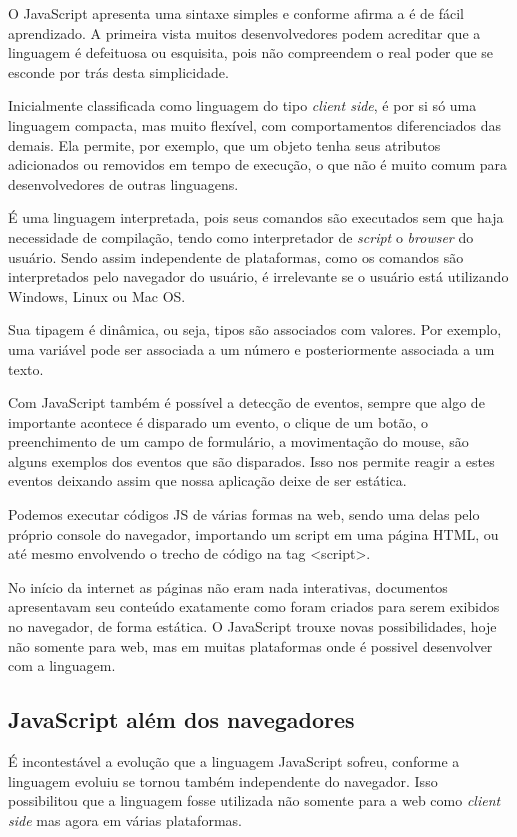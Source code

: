 \documentclass[
	12pt,				%
	openright,			%
	twoside,			%
	a4paper,			%
	english,			%
	brazil				%
	]{abntex2}
\begin{document}
O JavaScript apresenta uma sintaxe simples e conforme afirma a \citeauthor{w3schools_javascript} é de fácil aprendizado. A primeira vista muitos desenvolvedores podem acreditar que a linguagem é defeituosa ou esquisita, pois não compreendem o real poder que se esconde por trás desta simplicidade.

Inicialmente classificada como linguagem do tipo \textit{client side}, é por si só uma linguagem compacta, mas muito flexível, com comportamentos diferenciados das demais. Ela permite, por exemplo, que um objeto tenha seus atributos adicionados ou removidos em tempo de execução, o que não é muito comum para desenvolvedores de outras linguagens.

É uma linguagem interpretada, pois seus comandos são executados sem que haja necessidade de compilação, tendo como interpretador de \textit{script} o \textit{browser} do usuário. Sendo assim independente de plataformas, como os comandos são interpretados pelo navegador do usuário, é irrelevante se o usuário está utilizando Windows, Linux ou Mac OS.

Sua tipagem é dinâmica, ou seja, tipos são associados com valores. Por exemplo, uma variável pode ser associada a um número e posteriormente associada a um texto.

Com JavaScript também é possível a detecção de eventos, sempre que algo de importante acontece é disparado um evento, o clique de um botão, o preenchimento de um campo de formulário, a movimentação do mouse, são alguns exemplos dos eventos que são disparados. Isso nos permite reagir a estes eventos deixando assim que nossa aplicação deixe de ser estática.

Podemos executar códigos JS de várias formas na web, sendo uma delas pelo próprio console do navegador, importando um script em uma página HTML, ou até mesmo envolvendo o trecho de código na tag <script>.

No início da internet as páginas não eram nada interativas, documentos apresentavam seu conteúdo exatamente como foram criados para serem exibidos no navegador, de forma estática. O JavaScript trouxe novas possibilidades, hoje não somente para web, mas em muitas plataformas onde é possivel desenvolver com a linguagem. 

\subsection{JavaScript além dos navegadores}

É incontestável a evolução que a linguagem JavaScript sofreu, conforme a linguagem evoluiu se tornou também independente do navegador. Isso possibilitou que a linguagem fosse utilizada não somente para a web como \textit{client side} mas agora em várias plataformas. 
\end{document}

